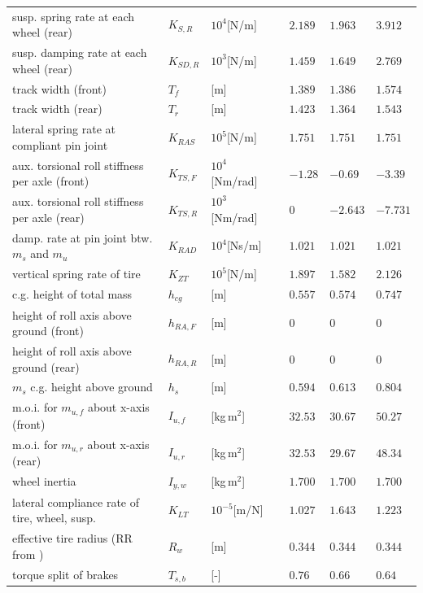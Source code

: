\documentclass[11pt,a4paper]{article}
\renewcommand{\^}[1]{^{(#1)}}
\begin{document}
\begin{table}[h!tb]
{\begin{center}
\begin{tabular}{lllclll}
	susp. spring rate at each wheel (rear) & $K_{S,R}$ & $10^4$[N/m] && $2.189$ & $1.963$ & $3.912$ \\ %
	susp. damping rate at each wheel (rear) & $K_{SD,R}$ & $10^3$[N/m] && $1.459$ & $1.649$ & $2.769$ \\ %
	track width (front) & $T_f$ & [m] && $1.389$ & $1.386$ & $1.574$ \\ %
	track width (rear) & $T_r$ & [m] && $1.423$ & $1.364$ & $1.543$ \\ %
	lateral spring rate at compliant pin joint %
	& $K_{RAS}$ & $10^5$[N/m] && $1.751$ & $1.751$ & $1.751$ \\ %
	aux. torsional roll stiffness per axle (front) & $K_{TS,F}$ & $10^4$[Nm/rad] && $-1.28$ & $-0.69$ & $-3.39$ \\ %
	aux. torsional roll stiffness per axle (rear) & $K_{TS,R}$ & $10^3$[Nm/rad] && $0$ & $-2.643$ & $-7.731$ \\ %
	damp. rate at pin joint btw. $m_s$ and $m_u$ & $K_{RAD}$ & $10^4$[Ns/m] && $1.021$ & $1.021$ & $1.021$ \\ %
	vertical spring rate of tire & $K_{ZT}$ & $10^5$[N/m] && $1.897$ & $1.582$ & $2.126$ \\ %
	c.g. height of total mass & $h_{cg}$ & [m] && $0.557$ & $0.574$ & $0.747$ \\ %
	height of roll axis above ground (front) & $h_{RA,F}$ & [m] && $0$ & $0$ & $0$ \\ %
	height of roll axis above ground (rear) & $h_{RA,R}$ & [m] && $0$ & $0$ & $0$ \\ %
	$m_s$ c.g. height above ground & $h_s$ & [m] && $0.594$ & $0.613$ & $0.804$ \\ %
	m.o.i. for $m_{u,f}$ about x-axis (front) & $I_{u,f}$ & [kg\,m$^2$] && $32.53$ & $30.67$ & $50.27$ \\ %
	m.o.i. for $m_{u,r}$ about x-axis (rear) & $I_{u,r}$ & [kg\,m$^2$] && $32.53$ & $29.67$ & $48.34$ \\ %
	wheel inertia & $I_{y,w}$ & [kg\,m$^2$] && $1.700$  & $1.700$   & $1.700$ \\ 
	lateral compliance rate of tire, wheel, susp. & $K_{LT}$ & $10^{-5}$[m/N] && $1.027$ & $1.643$ & $1.223$ \\ 
	effective tire radius (RR from \cite[PAC2002]{Adams2011}) & $R_w$ & [m] && $0.344$ & $0.344$ & $0.344$ \\ 
	torque split of brakes & $T_{s,b}$ & [-] && $0.76$ & $0.66$ & $0.64$ \\

\end{tabular}
\end{center}}
\end{table}
\end{document}
